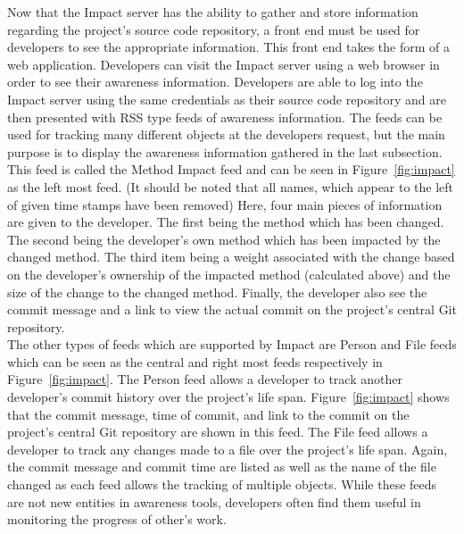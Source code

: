 \documentclass[conference]{IEEEtran}
\begin{document}
Now that the Impact server has the ability to gather and store information regarding the project's source code
repository, a front end must be used for developers to see the appropriate information. This front end
takes the form of a web application. Developers can visit the Impact server using a web browser in order to
see their awareness information. Developers are able to log into the Impact server using the same credentials 
as their source code repository and are then presented with RSS type feeds of awareness information.
The feeds can be used for tracking many different objects at the developers request, but the main purpose
is to display the awareness information gathered in the last subsection. This feed is called the Method Impact
feed and can be seen in Figure~\ref{fig:impact} as the left most feed. (It should be noted that all names, which
appear to the left of given time stamps have been removed) Here, four main pieces of information
are given to the developer. The first being the method which has been changed. The second being the
developer's own method which has been impacted by the changed method. The third item being
a weight associated with the change based on the developer's ownership of the impacted method
(calculated above) and the size of the change to the changed method. Finally, the developer also
see the commit message and a link to view the actual commit on the project's central Git
repository. \\

The other types of feeds which are supported by Impact are Person and File feeds which can be seen as
the central and right most feeds respectively in Figure~\ref{fig:impact}. The Person feed allows a developer
to track another developer's commit history over the project's life span. Figure~\ref{fig:impact} shows that
the commit message, time of commit, and link to the commit on the project's central Git repository
are shown in this feed. The File feed allows a developer to track any changes made to a file over the
project's life span. Again, the commit message and commit time are listed as well as the name
of the file changed as each feed allows the tracking of multiple objects. While these feeds are not
new entities in awareness tools, developers often find them useful in monitoring the progress
of other's work.\\
\end{document}
